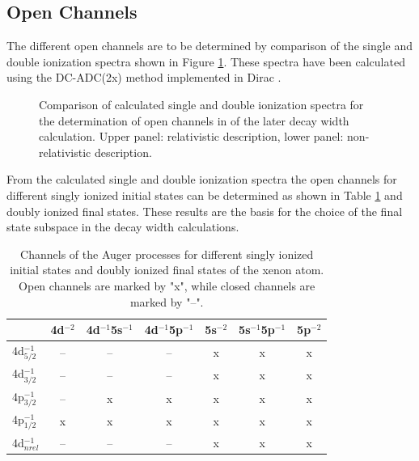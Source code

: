 \subsection{Open Channels}
The different open channels are to be determined by comparison of the single
and double ionization spectra shown in Figure \ref{figure:Xe_sdip}.
These spectra have been calculated using the
DC-ADC(2x) method implemented in Dirac
\cite{Pernpointner04_1,Pernpointner10_1,DIRAC13}.

\begin{figure}[]
  \centering
  
  
  \caption{Comparison of calculated single and double ionization spectra
           for the determination of open channels in of the later decay
           width calculation. Upper panel: relativistic description, lower
           panel: non-relativistic description.
           }
  \label{figure:Xe_sdip}
\end{figure}


From the calculated single and double ionization spectra the open channels
for different singly ionized initial states can be determined as shown in 
Table \ref{table:Xe_open_channels} and doubly ionized final states.
These results are the basis for the choice of the final state subspace
in the decay width calculations.
\begin{table}[h]
  \centering
  \caption{Channels of the Auger processes for different singly ionized
           initial states and doubly ionized final states
           of the xenon atom. Open channels are marked by "x", while closed
           channels are marked by "--".}
  \begin{tabular}{lcccccc}
   \toprule
                   & 4d$^{-2}$ & 4d$^{-1}$5s$^{-1}$ & 4d$^{-1}$5p$^{-1}$ & 5s$^{-2}$ & 5s$^{-1}$5p$^{-1}$ & 5p$^{-2}$ \\
   \midrule
   4d$_{5/2}^{-1}$ &      --   &       --           &        --          &     x     &     x              &     x     \\
   4d$_{3/2}^{-1}$ &      --   &       --           &        --          &     x     &     x              &     x     \\
   4p$_{3/2}^{-1}$ &      --   &        x           &         x          &     x     &     x              &     x     \\
   4p$_{1/2}^{-1}$ &       x   &        x           &         x          &     x     &     x              &     x     \\
   \midrule
   4d$^{-1}_{nrel}$&      --   &       --           &        --          &     x     &     x              &     x     \\
   \bottomrule
  \end{tabular}
  \label{table:Xe_open_channels}
\end{table}




